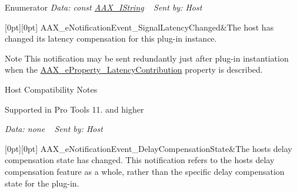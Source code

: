 \begin{DoxyEnumFields}{Enumerator}
{\itshape Data\+: {\ttfamily const} \mbox{\hyperlink{a01873}{A\+A\+X\+\_\+\+I\+String}}} ~\newline
 {\itshape Sent by\+: Host} \\
\hline

[0pt][0pt]{}\mbox{\label{a00491_afab5ea2cfd731fc8f163b6caa685406ea06ab4b075ecb523d0dde3ec19b76a756}} 
A\+A\+X\+\_\+e\+Notification\+Event\+\_\+\+Signal\+Latency\+Changed&The host has changed its latency compensation for this plug-\/in instance. \begin{DoxyNote}{Note}
This notification may be sent redundantly just after plug-\/in instantiation when the \mbox{\hyperlink{a00662_a13e384f22825afd3db6d68395b79ce0daa9037ffd2caf892bafe8f7f170548cb4}{A\+A\+X\+\_\+e\+Property\+\_\+\+Latency\+Contribution}} property is described.
\end{DoxyNote}
\begin{DoxyRefDesc}{Host Compatibility Notes}
\item[\mbox{\hyperlink{a00786__compatibility_notes000040}{Host Compatibility Notes}}]Supported in Pro Tools 11. and higher\end{DoxyRefDesc}


{\itshape Data\+: none} ~\newline
 {\itshape Sent by\+: Host} \\
\hline

[0pt][0pt]{}\mbox{\label{a00491_afab5ea2cfd731fc8f163b6caa685406ea3336fd8cb2428399ab640ee91582c626}} 
A\+A\+X\+\_\+e\+Notification\+Event\+\_\+\+Delay\+Compensation\+State&The host\textquotesingle{}s delay compensation state has changed. This notification refers to the host\textquotesingle{}s delay compensation feature as a whole, rather than the specific delay compensation state for the plug-\/in.


\end{DoxyEnumFields}
